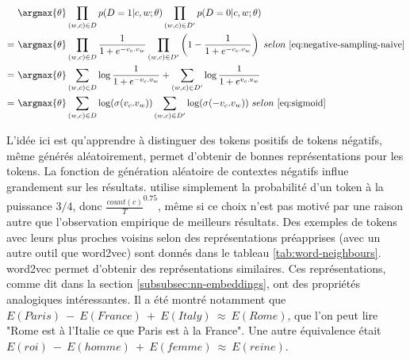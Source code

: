 \documentclass[12pt,a4paper,times,twoside,openright]{report}
\begin{document}
\begin{equation}\label{eq:negative-sampling}
\begin{aligned}
  &\ \argmax{\theta} \prod_{(w,c) \in D} p(D=1|c,w;\theta) \prod_{(w,c) \in D'} p(D=0|c,w;\theta) \\
= &\ \argmax{\theta} \prod_{(w,c) \in D} \frac{1}{1 + e^{-v_{c}.v_{w}}} \prod_{(w,c) \in D'} \left( 1 - \frac{1}{1 + e^{-v_{c}.v_{w}}} \right) \ selon\ \ref{eq:negative-sampling-naive} \\
= &\ \argmax{\theta} \sum_{(w,c) \in D} \log \frac{1}{1 + e^{-v_{c}.v_{w}}} + \sum_{(w,c) \in D'} \log \frac{1}{1 + e^{v_{c}.v_{w}}} \\
= &\ \argmax{\theta} \sum_{(w,c) \in D} \log(\sigma(v_{c}.v_{w})) \sum_{(w,c) \in D'} \log(\sigma(-v_{c}.v_{w}))\ selon\ \ref{eq:sigmoid}\\
\end{aligned}
\end{equation}

L'idée ici est qu'apprendre à distinguer des tokens positifs de tokens négatifs, même générés aléatoirement, permet d'obtenir de bonnes représentations pour les tokens. La fonction de génération aléatoire de contextes négatifs influe grandement sur les résultats. \citep{mikolov2013efficient} utilise simplement la probabilité d'un token à la puissance $3/4$, donc $\frac{count(c)}{T}^{0.75}$, même si ce choix n'est pas motivé par une raison autre que l'observation empirique de meilleurs résultats. Des exemples de tokens avec leurs plus proches voisins selon des représentations préapprises (avec un autre outil que word2vec) sont donnés dans le tableau \ref{tab:word-neighbours}. word2vec permet d'obtenir des représentations similaires. Ces représentations, comme dit dans la section \ref{subsubsec:nn-embeddings}, ont des propriétés analogiques intéressantes. Il a été montré notamment que $E(Paris)\ -\ E(France)\ +\ E(Italy)\ \approx\ E(Rome)$, que l'on peut lire "Rome est à l'Italie ce que Paris est à la France". Une autre équivalence était $E(roi)\ -\ E(homme)\ +\ E(femme)\ \approx\ E(reine)$.
\end{document}
